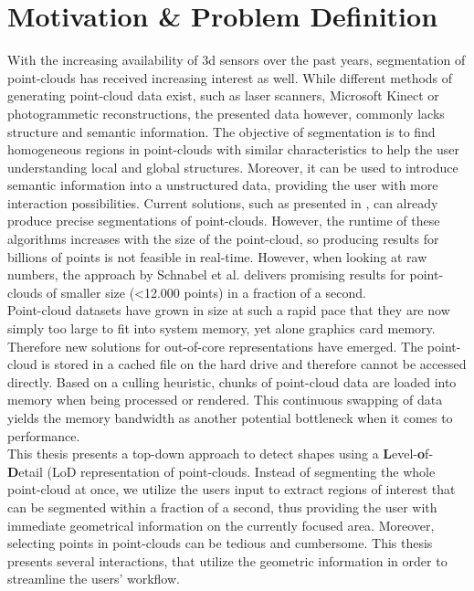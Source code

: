 \section{Motivation \& Problem Definition}

With the increasing availability of 3d sensors over the past years, segmentation of point-clouds has received increasing interest as well. While different methods of generating point-cloud data exist, such as laser scanners, Microsoft Kinect or photogrammetic reconstructions, the presented data however, commonly lacks structure and semantic information. The objective of segmentation is to find homogeneous regions in point-clouds with similar characteristics to help the user understanding local and global structures. Moreover, it can be used to introduce semantic information into a unstructured data, providing the user with more interaction possibilities. Current solutions, such as presented in \cite{schnabel-2007-efficient}, \cite{schnabel-2007-ransac} can already produce precise segmentations of point-clouds. However, the runtime of these algorithms increases with the size of the point-cloud, so producing results for billions of points is not feasible in real-time. However, when looking at raw numbers, the approach by Schnabel et al. \cite{schnabel-2007-ransac} delivers promising results for point-clouds of smaller size (\textless 12.000 points) in a fraction of a second. 
\\
Point-cloud datasets have grown in size at such a rapid pace that they are now simply too large to fit into system memory, yet alone graphics card memory. Therefore new solutions for out-of-core representations have emerged. The point-cloud is stored in a cached file on the hard drive and therefore cannot be accessed directly. Based on a culling heuristic, chunks of point-cloud data are loaded into memory when being processed or rendered. This continuous swapping of data yields the memory bandwidth as another potential bottleneck when it comes to performance.
\\

This thesis presents a top-down approach to detect shapes using a \textbf{L}evel-\textbf{o}f-\textbf{D}etail (LoD representation of point-clouds. Instead of segmenting the whole point-cloud at once, we utilize the users input to extract regions of interest that can be segmented within a fraction of a second, thus providing the user with immediate geometrical information on the currently focused area. Moreover, selecting points in point-clouds can be tedious and cumbersome. This thesis presents several interactions, that utilize the geometric information in order to streamline the users' workflow. 